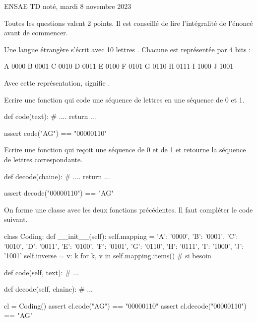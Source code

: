 %

\huge ENSAE TD noté, mardi 8 novembre 2023 \normalsize

Toutes les questions valent 2 points. Il est conseillé de lire l'intégralité de l'énoncé avant de commencer.

\exosubject{}
\begin{xexercice}\label{td_note_label4_2023}

Une langue étrangère s'écrit avec 10 lettres . Chacune est représentée par 4 bits :

\begin{verbatimx}
A 0000
B 0001
C 0010
D 0011
E 0100
F 0101
G 0110
H 0111
I 1000
J 1001
\end{verbatimx}

Avec cette représentation,  signifie .

\exequest Ecrire une fonction qui code une séquence de lettres en une séquence de 0 et 1.

\begin{verbatimx}
def code(text):
    # ....
    return ...

assert code("AG") == "00000110"
\end{verbatimx}

\exequest Ecrire une fonction qui reçoit une séquence de 0 et de 1 et retourne la séquence de lettres correspondante.

\begin{verbatimx}
def decode(chaine):
    # ....
    return ...

assert decode("00000110") == "AG"
\end{verbatimx}

\exequest On forme une classe avec les deux fonctions précédentes. Il faut compléter le code suivant.

\begin{verbatimx}
class Coding:
    def __init__(self):
        self.mapping = {'A': '0000', 'B': '0001', 'C': '0010', 'D': '0011',
                        'E': '0100', 'F': '0101', 'G': '0110', 'H': '0111',
                        'I': '1000', 'J': '1001' }
        self.inverse = {v: k for k, v in self.mapping.items()}  # si besoin

    def code(self, text):
        # ...

    def decode(self, chaine):
        # ...

cl = Coding()
assert cl.code("AG") == "00000110"
assert cl.decode("00000110") == "AG"
\end{verbatimx}


\end{xexercice}
